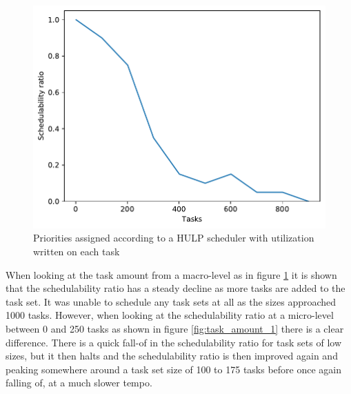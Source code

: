 \documentclass{kththesis}
\begin{document}
\begin{figure}[H]

    \centering

    \includegraphics[width=1.0\linewidth]{images/task_amount_2.pdf}

    \caption{Priorities assigned according to a HULP scheduler with utilization written on each task}

    \label{fig:task_amount_2}

\end{figure}

When looking at the task amount from a macro-level as in figure \ref{fig:task_amount_2} it is shown
that the schedulability ratio has a steady decline as more tasks are added to the task set. It was
unable to schedule any task sets at all as the sizes approached 1000 tasks. However, when looking at
the schedulability ratio at a micro-level between 0 and 250 tasks as shown in figure
\ref{fig:task_amount_1} there is a clear difference. There is a quick fall-of in the schedulability
ratio for task sets of low sizes, but it then halts and the schedulability ratio is then improved
again and peaking somewhere around a task set size of 100 to 175 tasks before once again falling of,
at a much slower tempo.
\end{document}
